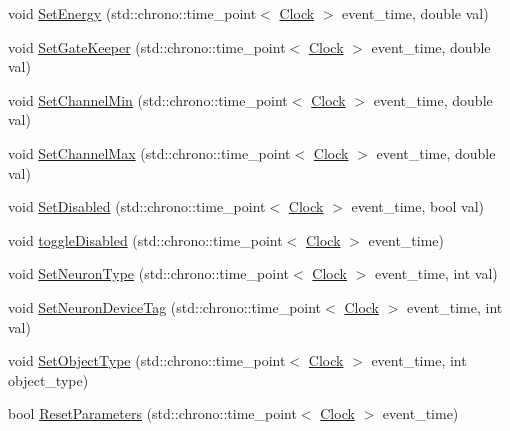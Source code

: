 \begin{DoxyCompactItemize}
void \hyperlink{class_neuron_a5efa690ce4d8ff2f8dfb1fbfd84c5279}{Set\+Energy} (std\+::chrono\+::time\+\_\+point$<$ \hyperlink{universe_8h_a0ef8d951d1ca5ab3cfaf7ab4c7a6fd80}{Clock} $>$ event\+\_\+time, double val)
\item 
void \hyperlink{class_neuron_a492f597021faf1b74942bc75364c3c22}{Set\+Gate\+Keeper} (std\+::chrono\+::time\+\_\+point$<$ \hyperlink{universe_8h_a0ef8d951d1ca5ab3cfaf7ab4c7a6fd80}{Clock} $>$ event\+\_\+time, double val)
\item 
void \hyperlink{class_neuron_ae463ad8173c63e7970a5f4594667d481}{Set\+Channel\+Min} (std\+::chrono\+::time\+\_\+point$<$ \hyperlink{universe_8h_a0ef8d951d1ca5ab3cfaf7ab4c7a6fd80}{Clock} $>$ event\+\_\+time, double val)
\item 
void \hyperlink{class_neuron_aed1ba99e24b905cd91a519c33b5a62b0}{Set\+Channel\+Max} (std\+::chrono\+::time\+\_\+point$<$ \hyperlink{universe_8h_a0ef8d951d1ca5ab3cfaf7ab4c7a6fd80}{Clock} $>$ event\+\_\+time, double val)
\item 
void \hyperlink{class_neuron_af9ad96e27f7692e9e328d90e4c96977a}{Set\+Disabled} (std\+::chrono\+::time\+\_\+point$<$ \hyperlink{universe_8h_a0ef8d951d1ca5ab3cfaf7ab4c7a6fd80}{Clock} $>$ event\+\_\+time, bool val)
\item 
void \hyperlink{class_neuron_a32fe82aa21f8a68392d696eea3a34c99}{toggle\+Disabled} (std\+::chrono\+::time\+\_\+point$<$ \hyperlink{universe_8h_a0ef8d951d1ca5ab3cfaf7ab4c7a6fd80}{Clock} $>$ event\+\_\+time)
\item 
void \hyperlink{class_neuron_afc685a0444425fceab6685a6ee004b65}{Set\+Neuron\+Type} (std\+::chrono\+::time\+\_\+point$<$ \hyperlink{universe_8h_a0ef8d951d1ca5ab3cfaf7ab4c7a6fd80}{Clock} $>$ event\+\_\+time, int val)
\item 
void \hyperlink{class_neuron_aa06d0f1a129e4a901a60e7343bc43533}{Set\+Neuron\+Device\+Tag} (std\+::chrono\+::time\+\_\+point$<$ \hyperlink{universe_8h_a0ef8d951d1ca5ab3cfaf7ab4c7a6fd80}{Clock} $>$ event\+\_\+time, int val)
\item 
void \hyperlink{class_neuron_ab371e2dacf2cdde8db5547b72fb45ca1}{Set\+Object\+Type} (std\+::chrono\+::time\+\_\+point$<$ \hyperlink{universe_8h_a0ef8d951d1ca5ab3cfaf7ab4c7a6fd80}{Clock} $>$ event\+\_\+time, int object\+\_\+type)
\item 
bool \hyperlink{class_neuron_a4c154fecb0b689d7da9d8d274f067ccf}{Reset\+Parameters} (std\+::chrono\+::time\+\_\+point$<$ \hyperlink{universe_8h_a0ef8d951d1ca5ab3cfaf7ab4c7a6fd80}{Clock} $>$ event\+\_\+time)
\item 

\end{DoxyCompactItemize}
